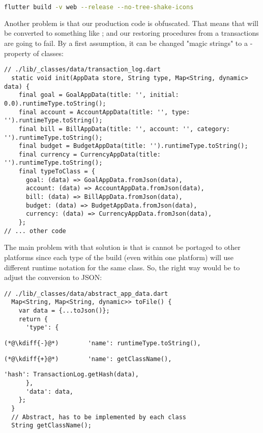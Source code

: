 \begin{lstlisting}[language=bash]
flutter build -v web --release --no-tree-shake-icons
\end{lstlisting}

Another problem is that our production code is obfuscated. That means that  will be converted to 
something like ; and our restoring procedures from a transactions are going to fail. By a first assumption,
it can be changed "magic strings" to a -property of classes:

\begin{lstlisting}
// ./lib/_classes/data/transaction_log.dart
  static void init(AppData store, String type, Map<String, dynamic> data) {
    final goal = GoalAppData(title: '', initial: 0.0).runtimeType.toString();
    final account = AccountAppData(title: '', type: '').runtimeType.toString();
    final bill = BillAppData(title: '', account: '', category: '').runtimeType.toString();
    final budget = BudgetAppData(title: '').runtimeType.toString();
    final currency = CurrencyAppData(title: '').runtimeType.toString();
    final typeToClass = {
      goal: (data) => GoalAppData.fromJson(data),
      account: (data) => AccountAppData.fromJson(data),
      bill: (data) => BillAppData.fromJson(data),
      budget: (data) => BudgetAppData.fromJson(data),
      currency: (data) => CurrencyAppData.fromJson(data),
    };
// ... other code
\end{lstlisting}

\noindent The main problem with that solution is that is cannot be portaged to other platforms since each type of the 
build (even within one platform) will use different runtime notation for the same class. So, the right way would be 
to adjust the conversion to JSON:

\begin{lstlisting}
// ./lib/_classes/data/abstract_app_data.dart
  Map<String, Map<String, dynamic>> toFile() {
    var data = {...toJson()};
    return {
      'type': {
\end{lstlisting}
{
\xpretocmd{\lstlisting}{\vspace{-12pt}}{}{}
\begin{lstlisting}[firstnumber=6, backgroundcolor=\color{backred}]
(*@\kdiff{-}@*)        'name': runtimeType.toString(),
\end{lstlisting}
\begin{lstlisting}[firstnumber=6, backgroundcolor=\color{backgreen}]
(*@\kdiff{+}@*)        'name': getClassName(),
\end{lstlisting}
\begin{lstlisting}[firstnumber=7]
        'hash': TransactionLog.getHash(data),
      },
      'data': data,
    };
  }
  // Abstract, has to be implemented by each class
  String getClassName();
\end{lstlisting}
}

